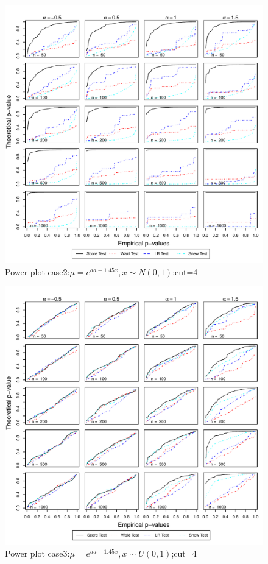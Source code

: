 \documentclass[11pt]{article}
\numberwithin{equation}{section}
\begin{document}
\begin{figure}
  \centering
  \includegraphics[width=\columnwidth]{./figure/q/q42.pdf}
  \caption{Power plot case2:$\mu=e^{aa-1.45x},x\sim N(0,1)$;cut=4}
\end{figure}

\begin{figure}
  \centering
  \includegraphics[width=\columnwidth]{./figure/q/q43.pdf}
  \caption{Power plot case3:$\mu=e^{aa-1.45x},x\sim U(0,1)$;cut=4}
\end{figure}
\end{document}
